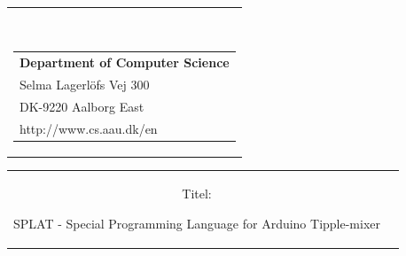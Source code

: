 


% 

\begin{nopagebreak}
{\samepage
\hspace{8cm}
\begin{tabular}{r}
\parbox{\textwidth}{  
\hfill
\\
\parbox{8cm}{\begin{tabular}{l}
{\small \textbf{Department of Computer Science}}\\
{\small Selma Lagerlöfs Vej 300} \\
{\small DK-9220 Aalborg East} \\
{\small http://www.cs.aau.dk/en}
\end{tabular}}}

\end{tabular}
\hspace{0cm}

\vspace{-5cm}
\begin{tabular}{cc}
\parbox{7cm}{
\begin{description}

\item {Titel:} 

SPLAT - Special Programming Language for Arduino Tipple-mixer


\end{description}}
\end{tabular}}
\end{nopagebreak}
